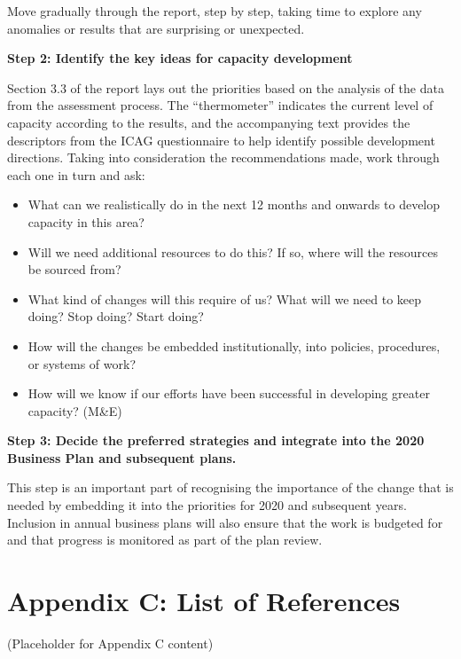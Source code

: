 \documentclass[
  10pt,
]{report}
\providecommand{\tightlist}{%
  \setlength{\itemsep}{0pt}\setlength{\parskip}{0pt}}
\begin{document}
Move gradually through the report, step by step, taking time to explore
any anomalies or results that are surprising or unexpected.

\textbf{Step 2: Identify the key ideas for capacity development}

Section 3.3 of the report lays out the priorities based on the analysis
of the data from the assessment process. The ``thermometer'' indicates
the current level of capacity according to the results, and the
accompanying text provides the descriptors from the ICAG questionnaire
to help identify possible development directions. Taking into
consideration the recommendations made, work through each one in turn
and ask:

\begin{itemize}
\tightlist
\item
  What can we realistically do in the next 12 months and onwards to
  develop capacity in this area?
\item
  Will we need additional resources to do this? If so, where will the
  resources be sourced from?
\item
  What kind of changes will this require of us? What will we need to
  keep doing? Stop doing? Start doing?
\item
  How will the changes be embedded institutionally, into policies,
  procedures, or systems of work?
\item
  How will we know if our efforts have been successful in developing
  greater capacity? (M\&E)
\end{itemize}

\textbf{Step 3: Decide the preferred strategies and integrate into the
2020 Business Plan and subsequent plans.}

This step is an important part of recognising the importance of the
change that is needed by embedding it into the priorities for 2020 and
subsequent years. Inclusion in annual business plans will also ensure
that the work is budgeted for and that progress is monitored as part of
the plan review.

\chapter{Appendix C: List of
References}\label{appendix-c-list-of-references}

(Placeholder for Appendix C content)
\end{document}
